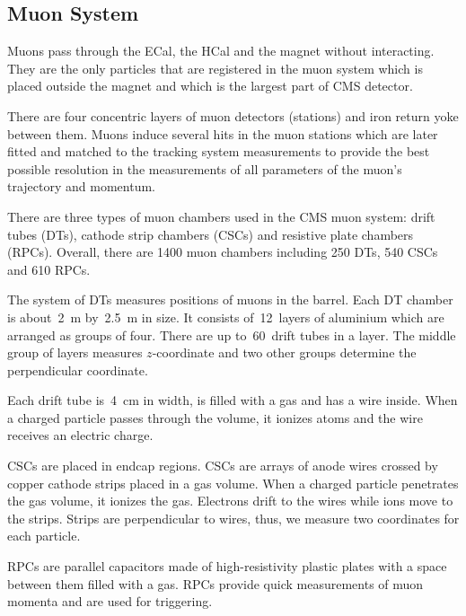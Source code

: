
\subsection{Muon System}

Muons pass through the ECal, the HCal and the magnet without interacting. They are the only particles that are registered in the muon system which is placed outside the magnet and which is the largest part of CMS detector.

There are four concentric layers of muon detectors (stations) and iron return yoke between them. Muons induce several hits in the muon stations which are later fitted and matched to the tracking system measurements to provide the best possible resolution in the measurements of all parameters of the muon's trajectory and momentum.

There are three types of muon chambers used in the CMS muon system: drift tubes (DTs), cathode strip chambers (CSCs) and resistive plate chambers (RPCs). Overall, there are 1400 muon chambers including 250 DTs, 540 CSCs and 610 RPCs.

The system of DTs measures positions of muons in the barrel. Each DT chamber is about~2~m by~2.5~m in size. It consists of~12~layers of aluminium which are arranged as groups of four. There are up to~60~drift tubes in a layer. The middle group of layers measures $z$-coordinate and two other groups determine the perpendicular coordinate.

Each drift tube is~4~cm in width, is filled with a gas and has a wire inside. When a charged particle passes through the volume, it ionizes atoms and the wire receives an electric charge.

CSCs are placed in endcap regions. CSCs are arrays of anode wires crossed by copper cathode strips placed in a gas volume. When a charged particle penetrates the gas volume, it ionizes the gas. Electrons drift to the wires while ions move to the strips. Strips are perpendicular to wires, thus, we measure two coordinates for each particle.  

RPCs are parallel capacitors made of high-resistivity plastic plates with a space between them filled with a gas. RPCs provide quick measurements of muon momenta and are used for triggering.  

